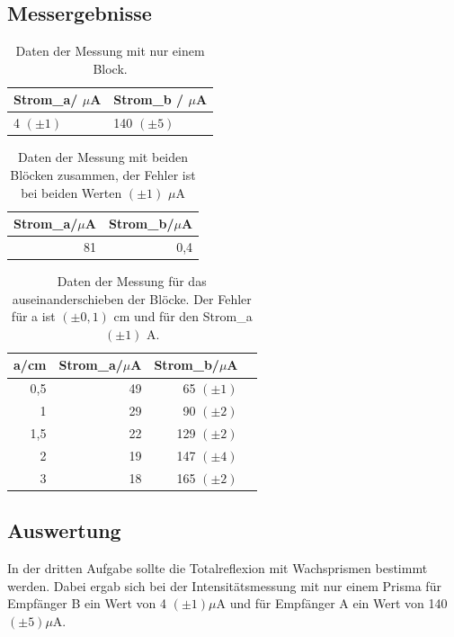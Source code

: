 \documentclass[12pt]{scrartcl}
\begin{document}
\subsection{Messergebnisse}
\begin{table}[htbp]
\caption{Daten der Messung mit nur einem Block.}
\centering
\begin{tabular}{|l|l|}
\hline
Strom\_a/ $\mu$A & Strom\_b / $\mu$A \\ \hline
4 $(\pm1)$ & 140 $(\pm 5)$ \\ \hline
\end{tabular}
\label{tab:a_3_e}
\end{table}

\begin{table}[H]
\caption{Daten der Messung mit beiden Blöcken zusammen, der Fehler ist bei beiden Werten $(\pm 1)$ $\mu$A}
\centering
\begin{tabular}{|l|l|}
\hline
Strom\_a/$\mu$A & Strom\_b/$\mu$A \\ \hline
\multicolumn{1}{|r|}{81} & \multicolumn{1}{r|}{0,4} \\ \hline
\end{tabular}
\label{tab:a_3_z}
\end{table}

\begin{table}[htbp]
\caption{Daten der Messung für das auseinanderschieben der Blöcke. Der Fehler für a ist $(\pm 0,1)$ cm und für den Strom\_a $(\pm 1)$ A.}
\centering
\begin{tabular}{|r|r|r|r|}
\hline
\multicolumn{1}{|l|}{a/cm} & \multicolumn{1}{l|}{Strom\_a/$\mu$A} & \multicolumn{1}{l|}{Strom\_b/$\mu$A} \\ \hline
0,5 & 49 & 65 $(\pm 1)$ \\ \hline
1 & 29 & 90 $(\pm 2)$ \\ \hline
1,5 & 22 & 129 $(\pm 2)$ \\ \hline
2 & 19 & 147 $(\pm 4)$ \\ \hline
3 & 18 & 165 $(\pm 2)$ \\ \hline
\end{tabular}
\label{tab:a_3_m}
\end{table}
\subsection{Auswertung}
In der dritten Aufgabe sollte die Totalreflexion mit Wachsprismen bestimmt werden.
Dabei ergab sich bei der Intensitätsmessung mit nur einem Prisma  für Empfänger B ein Wert von 4 $(\pm 1) \mu$A und für Empfänger A ein Wert von 140 $(\pm 5) \mu$A.
\end{document}
